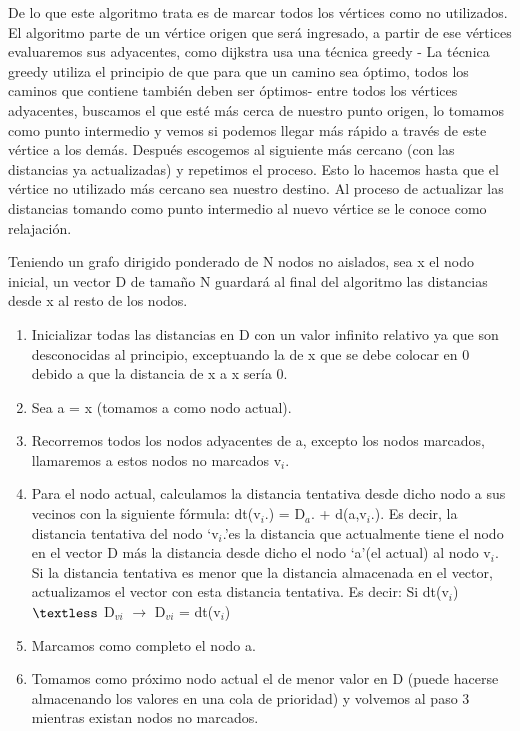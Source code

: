 De lo que este algoritmo trata es de marcar todos los vértices como no utilizados. El algoritmo parte
de un vértice origen que será ingresado, a partir de ese vértices evaluaremos sus adyacentes, como
dijkstra usa una técnica greedy - La técnica greedy utiliza el principio de que para que un camino
sea óptimo, todos los caminos que contiene también deben ser óptimos- entre todos los vértices
adyacentes, buscamos el que esté más cerca de nuestro punto origen, lo tomamos como punto
intermedio y vemos si podemos llegar más rápido a través de este vértice a los demás. Después
escogemos al siguiente más cercano (con las distancias ya actualizadas) y repetimos el proceso.
Esto lo hacemos hasta que el vértice no utilizado más cercano sea nuestro destino. Al proceso
de actualizar las distancias tomando como punto intermedio al nuevo vértice se le conoce como
relajación.

Teniendo un grafo dirigido ponderado de N nodos no aislados, sea x el nodo inicial, un vector D de tamaño N guardará al final del algoritmo las distancias desde x al resto de los nodos.

\begin{enumerate}
	\item Inicializar todas las distancias en D con un valor infinito relativo ya que son desconocidas al principio, exceptuando la de x que se debe colocar en 0 debido a que la distancia de x a x sería 0.
	\item Sea a = x (tomamos a como nodo actual).
	\item Recorremos todos los nodos adyacentes de a, excepto los nodos marcados, llamaremos a estos nodos no marcados v$_{i}$.
	\item  Para el nodo actual, calculamos la distancia tentativa desde dicho nodo a sus 
	vecinos con la siguiente fórmula: dt(v$_{i}$.) = D$_{a}$. + d(a,v$_{i}$.). Es decir, la 
	distancia tentativa del nodo \textquoteleft v$_{i}$.\textquoteright es la distancia que 
	actualmente tiene el nodo en el vector D más la distancia desde dicho el nodo 
	\textquoteleft a\textquoteright (el actual) al nodo v$_{i}$. Si la distancia tentativa 
	es menor que la distancia almacenada en el vector, actualizamos el vector con esta 
	distancia tentativa. Es decir: Si dt(v$_{i}$) $\textless$ D$_{vi}$ $\rightarrow$ D$_{vi}$ = dt(v$_{i}$)
	\item Marcamos como completo el nodo a.
	\item Tomamos como próximo nodo actual el de menor valor en D (puede hacerse almacenando los valores en una cola de prioridad) y volvemos al paso 3 mientras existan nodos no marcados.
\end{enumerate}



